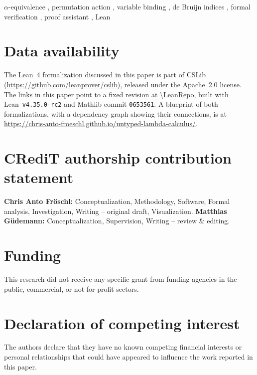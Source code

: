 \documentclass[a4paper,fleqn]{cas-sc}
\begin{document}
\begin{keywords}
$\alpha$-equivalence \sep
permutation action \sep
variable binding \sep
de Bruijn indices \sep
formal verification \sep
proof assistant \sep
Lean
\end{keywords}

\maketitle









\section*{Data availability}
The Lean~4 formalization discussed in this paper is part of CSLib
(\url{https://github.com/leanprover/cslib}), released under the
Apache~2.0 license. The links in this paper point to a fixed revision
at \url{\LeanRepo}, built with Lean~\texttt{v4.35.0-rc2} and Mathlib
commit \texttt{0653561}. A blueprint of both formalizations, with a
dependency graph showing their connections, is at
\url{https://chris-anto-froeschl.github.io/untyped-lambda-calculus/}.

\section*{CRediT authorship contribution statement}
\textbf{Chris Anto Fröschl:} Conceptualization, Methodology, Software,
Formal analysis, Investigation, Writing -- original draft,
Visualization. \textbf{Matthias Güdemann:} Conceptualization,
Supervision, Writing -- review \& editing.

\section*{Funding}
This research did not receive any specific grant from funding agencies
in the public, commercial, or not-for-profit sectors.

\section*{Declaration of competing interest}
The authors declare that they have no known competing financial
interests or personal relationships that could have appeared to
influence the work reported in this paper.
\end{document}
